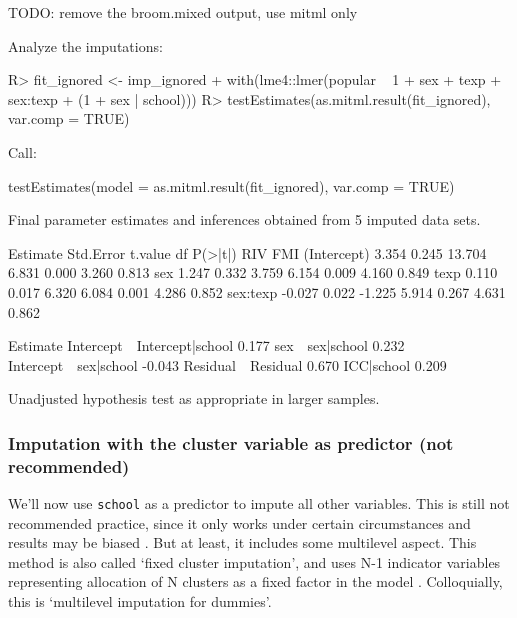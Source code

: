 \documentclass[
]{jss}
\begin{document}
TODO: remove the broom.mixed output, use mitml only

Analyze the imputations:

\begin{CodeChunk}
\begin{CodeInput}
R> fit_ignored <- imp_ignored %
+   with(lme4::lmer(popular ~ 1 + sex + texp + sex:texp + (1 + sex | school))) 
R> testEstimates(as.mitml.result(fit_ignored), var.comp = TRUE)
\end{CodeInput}
\begin{CodeOutput}

Call:

testEstimates(model = as.mitml.result(fit_ignored), var.comp = TRUE)

Final parameter estimates and inferences obtained from 5 imputed data sets.

             Estimate Std.Error   t.value        df   P(>|t|)       RIV       FMI 
(Intercept)     3.354     0.245    13.704     6.831     0.000     3.260     0.813 
sex             1.247     0.332     3.759     6.154     0.009     4.160     0.849 
texp            0.110     0.017     6.320     6.084     0.001     4.286     0.852 
sex:texp       -0.027     0.022    -1.225     5.914     0.267     4.631     0.862 

                            Estimate 
Intercept~~Intercept|school    0.177 
sex~~sex|school                0.232 
Intercept~~sex|school         -0.043 
Residual~~Residual             0.670 
ICC|school                     0.209 

Unadjusted hypothesis test as appropriate in larger samples.
\end{CodeOutput}
\end{CodeChunk}

\hypertarget{imputation-with-the-cluster-variable-as-predictor-not-recommended}{%
\subsubsection{Imputation with the cluster variable as predictor (not
recommended)}\label{imputation-with-the-cluster-variable-as-predictor-not-recommended}}

We'll now use \texttt{school} as a predictor to impute all other
variables. This is still not recommended practice, since it only works
under certain circumstances and results may be biased
\citep{drec15, ende16}. But at least, it includes some multilevel
aspect. This method is also called `fixed cluster imputation', and uses
N-1 indicator variables representing allocation of N clusters as a fixed
factor in the model \citep{reit06, ende16}. Colloquially, this is
`multilevel imputation for dummies'.
\end{document}
